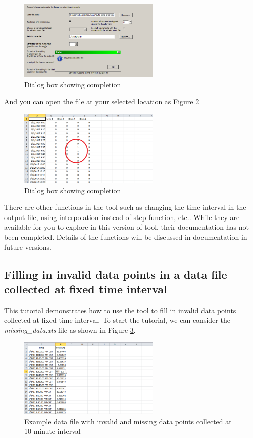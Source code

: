 \documentclass[12pt,a4paper]{article}
\begin{document}
\begin{figure}[H]
\centering
\includegraphics[width=0.6\textwidth]{complete.png}
\caption{Dialog box showing completion}
\label{fig:complete}
\end{figure}

And you can open the file at your selected location as Figure \ref{fig:step}

\begin{figure}[H]
\centering
\includegraphics[width=0.6\textwidth]{step.png}
\caption{Dialog box showing completion}
\label{fig:step}
\end{figure}

There are other functions in the tool such as changing the time interval in the output file, using interpolation instead of step function, etc..
While they are available for you to explore in this version of tool, their documentation has not been completed.
Details of the functions will be discussed in documentation in future versions.

\subsection{Filling in invalid data points in a data file collected at fixed time interval}
\label{sec:tutorial_invalid}

This tutorial demonstrates how to use the tool to fill in invalid data points collected at fixed time interval.
To start the tutorial, we can consider the \emph{missing\_data.xls} file as shown in Figure \ref{fig:missing_data}.

\begin{figure}[H]
\centering
\includegraphics[width=0.6\textwidth]{missing_data.png}
\caption{Example data file with invalid and missing data points collected at 10-minute interval}
\label{fig:missing_data}
\end{figure}
\end{document}
